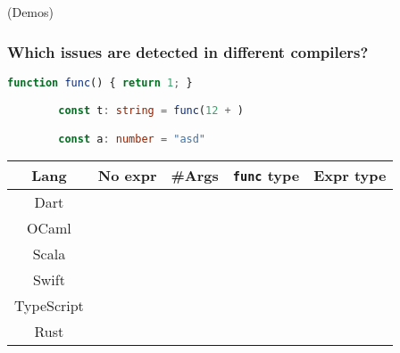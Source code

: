\documentclass[compress,12pt,xcolor={dvipsnames}]{beamer}
\newcommand{\xmark}{\ding{55}}%
\begin{document}
\begin{frame}[standout]
	\centering\large
	(Demos)
\end{frame}

\begin{frame}[fragile]
	\frametitle{Which issues are detected in different compilers?}
	\begin{lstlisting}[gobble=8,language=typescript,basicstyle=\tt\footnotesize]
        function func() { return 1; }

        const t: string = func(12 + )

        const a: number = "asd"
    \end{lstlisting}

	\begin{center}
		\begin{tabular}{||c| c c c c||}
			\hline
			Lang       & No expr    & \#Args     & \texttt{func} type & Expr type  \\
			\hline\hline
			Dart       & \checkmark & \checkmark & \checkmark         & \checkmark \\
			\hline
			OCaml      & \checkmark & \xmark     & \xmark             & \xmark     \\
			\hline
			Scala      & \checkmark & \xmark     & \xmark             & \checkmark \\
			\hline
			Swift      & \checkmark & \xmark     & \checkmark         & \checkmark \\
			\hline
			TypeScript & \checkmark & \checkmark & \checkmark         & \checkmark \\
			\hline
			Rust       & \checkmark & \xmark     & \xmark             & \checkmark \\
			\hline
		\end{tabular}
	\end{center}
\end{frame}
\end{document}
